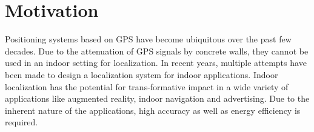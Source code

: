 \documentclass[journal,transmag]{IEEEtran}
\begin{document}



\maketitle


\IEEEdisplaynontitleabstractindextext







%
\IEEEpeerreviewmaketitle



\section{Motivation}
Positioning systems based on GPS have become ubiquitous over the past few decades. Due to the attenuation of GPS signals by concrete walls, they cannot be used in an indoor setting for localization. In recent years, multiple attempts have been made to design a localization system for indoor applications. Indoor localization has the potential for trans-formative impact in a wide variety of applications like augmented reality, indoor navigation and advertising. Due to the inherent nature of the applications, high accuracy as well as energy efficiency is required.
\end{document}
